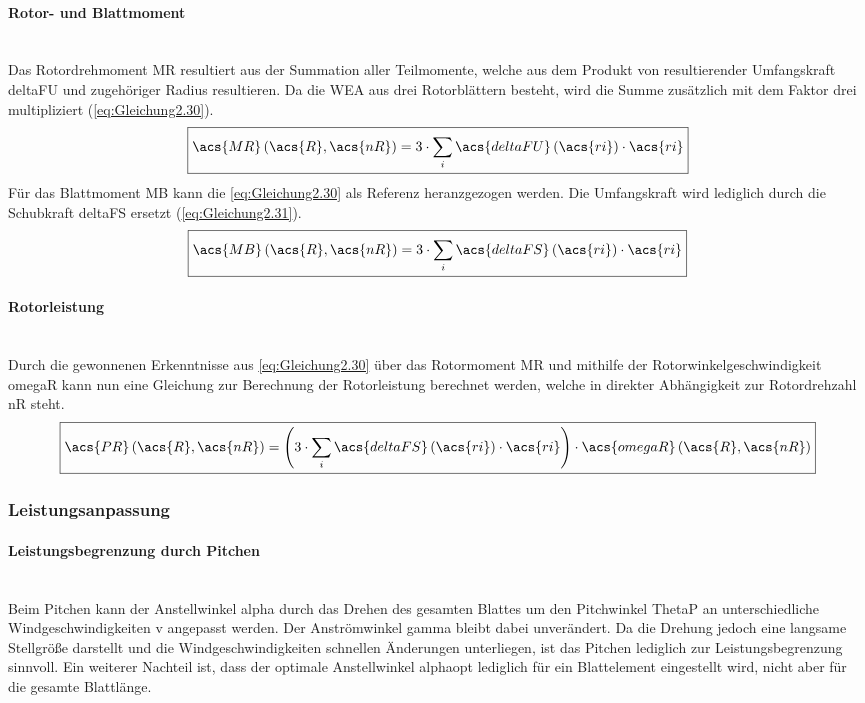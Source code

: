 \paragraph{Rotor- und Blattmoment}\mbox{}\smallskip\\
Das Rotordrehmoment \acs{MR} resultiert aus der Summation aller Teilmomente, welche aus dem Produkt von resultierender Umfangskraft \acs{deltaFU} und zugehöriger Radius resultieren. Da die WEA aus drei Rotorblättern besteht, wird die Summe zusätzlich mit dem Faktor drei multipliziert (\autoref{eq:Gleichung2.30}).
\begin{equation}\label{eq:Gleichung2.30}
    \boxed{\acs{MR}\left(\acs{R}, \acs{nR}\right) = 3 \cdot \sum_{i}^{} \acs{deltaFU}\left(\acs{ri}\right) \cdot \acs{ri}}
\end{equation}
\newline
Für das Blattmoment \acs{MB} kann die \autoref{eq:Gleichung2.30} als Referenz heranzgezogen werden. Die Umfangskraft wird lediglich durch die Schubkraft \acs{deltaFS} ersetzt (\autoref{eq:Gleichung2.31}).
\begin{equation}\label{eq:Gleichung2.31}
    \boxed{\acs{MB}\left(\acs{R}, \acs{nR}\right) = 3 \cdot \sum_{i}^{} \acs{deltaFS}\left(\acs{ri}\right) \cdot \acs{ri}}
\end{equation}

\paragraph{Rotorleistung}\mbox{}\smallskip\\
Durch die gewonnenen Erkenntnisse aus \autoref{eq:Gleichung2.30} über das Rotormoment \acs{MR} und mithilfe der Rotorwinkelgeschwindigkeit \acs{omegaR} kann nun eine Gleichung zur Berechnung der Rotorleistung berechnet werden, welche in direkter Abhängigkeit zur Rotordrehzahl \acs{nR} steht.
\begin{equation}
    \boxed{\acs{PR}\left(\acs{R}, \acs{nR}\right) = \left(3 \cdot \sum_{i}^{} \acs{deltaFS}\left(\acs{ri}\right) \cdot \acs{ri}\right) \cdot \acs{omegaR}\left(\acs{R}, \acs{nR}\right)}
\end{equation}

\subsubsection{Leistungsanpassung}

\paragraph{Leistungsbegrenzung durch Pitchen}\mbox{}\smallskip\\
Beim Pitchen kann der Anstellwinkel \acs{alpha} durch das Drehen des gesamten Blattes um den Pitchwinkel \acs{ThetaP} an unterschiedliche Windgeschwindigkeiten \acs{v} angepasst werden. Der Anströmwinkel \acs{gamma} bleibt dabei unverändert. Da die Drehung jedoch eine langsame Stellgröße darstellt und die Windgeschwindigkeiten schnellen Änderungen unterliegen, ist das Pitchen lediglich zur Leistungsbegrenzung sinnvoll. Ein weiterer Nachteil ist, dass der optimale Anstellwinkel \acs{alphaopt} lediglich für ein Blattelement eingestellt wird, nicht aber für die gesamte Blattlänge.

